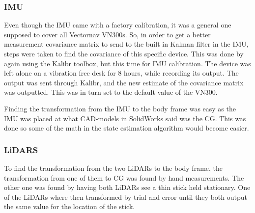 \subsubsection{IMU}

Even though the IMU came with a factory calibration, it was a general one supposed to cover all Vectornav VN300s. So, in order to get a better measurement covariance matrix to send to the built in Kalman filter in the IMU, steps were taken to find the covariance of this specific device. This was done by again using the Kalibr toolbox, but this time for IMU calibration. The device was left alone on a vibration free desk for 8 hours, while recording its output. The output was sent through Kalibr, and the new estimate of the covariance matrix was outputted. This was in turn set to the default value of the VN300. 

Finding the transformation from the IMU to the body frame was easy as the IMU was placed at what CAD-models in SolidWorks said was the CG. This was done so some of the math in the state estimation algorithm would become easier.

\subsubsection{LiDARS}

To find the transformation from the two LiDARs to the body frame, the transformation from one of them to CG was found by hand measurements. The other one was found by having both LiDARs see a thin stick held stationary. One of the LiDARs where then transformed by trial and error until they both output the same value for the location of the stick. 

\fi